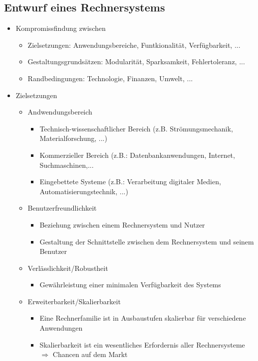 \subsection{Entwurf eines Rechnersystems}
\begin{itemize}
	\item Kompromissfindung zwischen
	\begin{itemize}
		\item Zielsetzungen: Anwendungsbereiche, Funtkionalität, Verfügbarkeit, ...
		\item Gestaltungsgrundsätzen: Modularität, Sparksamkeit, Fehlertoleranz, ...
		\item Randbedingungen: Technologie, Finanzen, Umwelt, ...
	\end{itemize}
	\item Zielsetzungen
	\begin{itemize}
		\item Andwendungsbereich
		\begin{itemize}
			\item Technisch-wissenschaftlicher Bereich (z.B. Strömungsmechanik, Materialforschung, ...)
			\item Kommerzieller Bereich (z.B.: Datenbankanwendungen, Internet, Suchmaschinen,...
			\item Eingebettete Systeme (z.B.: Verarbeitung digitaler Medien, Automatisierungstechnik, ...)
		\end{itemize}
		\item Benutzerfreundlichkeit
		\begin{itemize}
			\item Beziehung zwischen einem Rechnersystem und Nutzer
			\item Gestaltung der Schnittstelle zwischen dem Rechnersystem und seinem Benutzer
		\end{itemize}
		\item Verlässlichkeit/Robustheit
		\begin{itemize}
			\item Gewährleistung einer minimalen Verfügbarkeit des Systems
		\end{itemize}
		\item Erweiterbarkeit/Skalierbarkeit
		\begin{itemize}
			\item Eine Rechnerfamilie ist in Ausbaustufen skalierbar für verschiedene Anwendungen
			\item Skalierbarkeit ist ein wesentliches Erfordernis aller Rechnersysteme \\ \(\Rightarrow\) Chancen auf dem Markt

\end{itemize}
\end{itemize}
\end{itemize}
